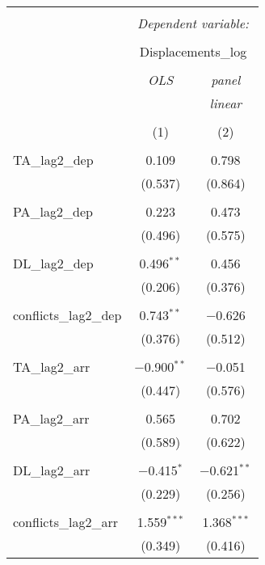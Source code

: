 
\begin{table}[!htbp] \centering 
  \caption{} 
  \label{} 
\begin{tabular}{@{\extracolsep{5pt}}lcc} 
\\[-1.8ex]\hline 
\hline \\[-1.8ex] 
 & \multicolumn{2}{c}{\textit{Dependent variable:}} \\ 
\cline{2-3} 
\\[-1.8ex] & \multicolumn{2}{c}{Displacements\_log} \\ 
\\[-1.8ex] & \textit{OLS} & \textit{panel} \\ 
 & \textit{} & \textit{linear} \\ 
\\[-1.8ex] & (1) & (2)\\ 
\hline \\[-1.8ex] 
 TA\_lag2\_dep & 0.109 & 0.798 \\ 
  & (0.537) & (0.864) \\ 
  & & \\ 
 PA\_lag2\_dep & 0.223 & 0.473 \\ 
  & (0.496) & (0.575) \\ 
  & & \\ 
 DL\_lag2\_dep & 0.496$^{**}$ & 0.456 \\ 
  & (0.206) & (0.376) \\ 
  & & \\ 
 conflicts\_lag2\_dep & 0.743$^{**}$ & $-$0.626 \\ 
  & (0.376) & (0.512) \\ 
  & & \\ 
 TA\_lag2\_arr & $-$0.900$^{**}$ & $-$0.051 \\ 
  & (0.447) & (0.576) \\ 
  & & \\ 
 PA\_lag2\_arr & 0.565 & 0.702 \\ 
  & (0.589) & (0.622) \\ 
  & & \\ 
 DL\_lag2\_arr & $-$0.415$^{*}$ & $-$0.621$^{**}$ \\ 
  & (0.229) & (0.256) \\ 
  & & \\ 
 conflicts\_lag2\_arr & 1.559$^{***}$ & 1.368$^{***}$ \\ 
  & (0.349) & (0.416) \\ 

\end{tabular}
\end{table}
